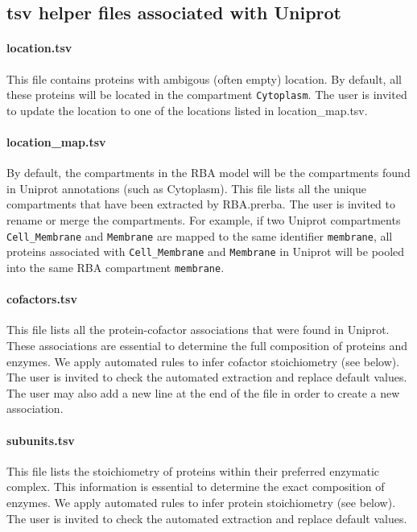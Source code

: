 \subsection{tsv helper files associated with Uniprot}

\paragraph{location.tsv}
This file contains proteins with ambigous (often empty) location.
By default, all these proteins will be located in the compartment \texttt{Cytoplasm}.
The user is invited to update the location to one of the locations listed in location\_map.tsv.

\paragraph{location\_map.tsv}
By default, the compartments in the RBA model will be the compartments
found in Uniprot annotations (such as Cytoplasm).
This file lists all the unique compartments that have been extracted by RBA.prerba.
The user is invited to rename or merge the compartments.
For example, if two Uniprot compartments \texttt{Cell\_Membrane} and \texttt{Membrane} are mapped
to the same identifier \texttt{membrane},
all proteins associated with \texttt{Cell\_Membrane} and \texttt{Membrane} in Uniprot will
be pooled into the same RBA compartment \texttt{membrane}.

\paragraph{cofactors.tsv}
This file lists all the protein-cofactor associations that were found in Uniprot.
These associations are essential to determine the full composition of proteins and enzymes.
We apply automated rules to infer cofactor stoichiometry (see below).
The user is invited to check the automated extraction and replace default values.
The user may also add a new line at the end of the file in order to create a new association.

\paragraph{subunits.tsv}
This file lists the stoichiometry of proteins within their preferred enzymatic complex.
This information is essential to determine the exact composition of enzymes.
We apply automated rules to infer protein stoichiometry (see below).
The user is invited to check the automated extraction and replace default values.

